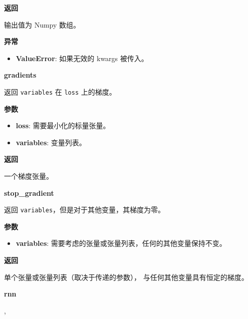 \textbf{返回}

输出值为 Numpy 数组。

\textbf{异常}

\begin{itemize}
\tightlist
\item
  \textbf{ValueError}: 如果无效的 kwargs 被传入。
\end{itemize}


\textbf{gradients}\label{gradients}

\begin{Shaded}
\begin{Highlighting}[]
\end{Highlighting}
\end{Shaded}

返回 \texttt{variables} 在 \texttt{loss} 上的梯度。

\textbf{参数}

\begin{itemize}
\tightlist
\item
  \textbf{loss}: 需要最小化的标量张量。
\item
  \textbf{variables}: 变量列表。
\end{itemize}

\textbf{返回}

一个梯度张量。


\textbf{stop\_gradient}\label{stopux5fgradient}

\begin{Shaded}
\begin{Highlighting}[]
\end{Highlighting}
\end{Shaded}

返回 \texttt{variables}，但是对于其他变量，其梯度为零。

\textbf{参数}

\begin{itemize}
\tightlist
\item
  \textbf{variables}: 需要考虑的张量或张量列表，任何的其他变量保持不变。
\end{itemize}

\textbf{返回}

单个张量或张量列表（取决于传递的参数）， 与任何其他变量具有恒定的梯度。


\textbf{rnn}\label{rnn}

\begin{Shaded}
\begin{Highlighting}[]
\OperatorTok{=}, \\
\hspace{3cm}\OperatorTok{=}\OperatorTok{=}\OperatorTok{=}\OperatorTok{=}\NormalTok{)}
\end{Highlighting}
\end{Shaded}


